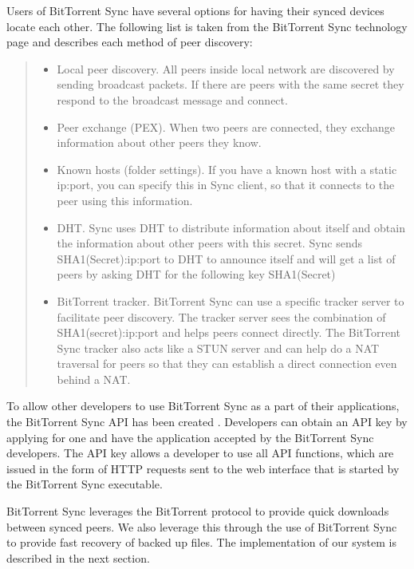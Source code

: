 \documentclass[a4paper]{article}
\begin{document}
Users of BitTorrent Sync have several options for having their synced devices locate each other. The following list is taken from the BitTorrent Sync technology page \cite{btsynctech} and describes each method of peer discovery:

\begin{quote}
\begin{itemize}
\item Local peer discovery. All peers inside local network are discovered by sending broadcast packets. If there are peers with the same secret they respond to the broadcast message and connect.
\item Peer exchange (PEX). When two peers are connected, they exchange information about other peers they know.
\item Known hosts (folder settings). If you have a known host with a static ip:port, you can specify this in Sync client, so that it connects to the peer using this information.
\item DHT. Sync uses DHT to distribute information about itself and obtain the information about other peers with this secret. Sync sends SHA1(Secret):ip:port to DHT to announce itself and will get a list of peers by asking DHT for the following key SHA1(Secret)
\item BitTorrent tracker. BitTorrent Sync can use a specific tracker server to facilitate peer discovery. The tracker server sees the combination of SHA1(secret):ip:port and helps peers connect directly. The BitTorrent Sync tracker also acts like a STUN server and can help do a NAT traversal for peers so that they can establish a direct connection even behind a NAT.
\end{itemize}
\end{quote}

To allow other developers to use BitTorrent Sync as a part of their applications, the BitTorrent Sync API has been created \cite{btsyncapi}. Developers can obtain an API key by applying for one and have the application accepted by the BitTorrent Sync developers. The API key allows a developer to use all API functions, which are issued in the form of HTTP requests sent to the web interface that is started by the BitTorrent Sync executable.

BitTorrent Sync leverages the BitTorrent protocol to provide quick downloads between synced peers. We also leverage this through the use of BitTorrent Sync to provide fast recovery of backed up files. The implementation of our system is described in the next section.
\end{document}
